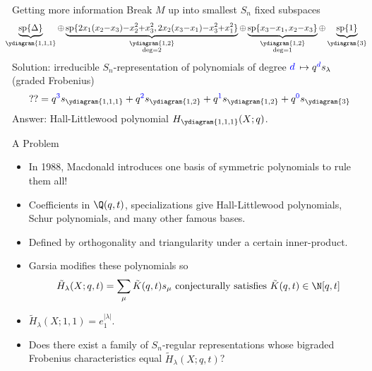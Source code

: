 \documentclass[dvipsnames]{beamer}
\renewcommand{\Span}{\operatorname{sp}}
\theoremstyle{definition}
\newcounter{c}
\begin{document}
\begin{frame}{Getting more information}
  \pause
  Break \(M\) up into smallest \(S_n\) fixed subspaces 
  \[
    \hspace{-0.75em}
    \scalebox{0.95}{\(
      \underbrace{\Span\{\Delta\}}_{\ydiagram{1,1,1}} {\oplus} \underbrace{\Span\{2x_1(x_2{-}x_3){-}x_2^2{+}x_3^2,
        2x_2(x_3{-}x_1){-}x_3^2{+}x_1^2\}}_{\substack{\ydiagram{1,2}\\\deg
        = 2}} {\oplus}
      \underbrace{\Span\{x_3{-}x_1, x_2{-}x_3\}}_{\substack{\ydiagram{1,2}\\\deg=1}} {\oplus} \underbrace{\Span\{1\}}_{\ydiagram{3}}\)}
  \]
  \pause
  Solution: irreducible \(S_n\)-representation of polynomials of degree \(\textcolor{blue}{d}\) \(\mapsto q^{\textcolor{blue}{d}}
  s_\lambda\) (graded Frobenius)\[
    ?? = q^{\textcolor{blue}{3}} s_{\ydiagram{1,1,1}} + q^{\textcolor{blue}{2}} s_{\ydiagram{1,2}} + q^{\textcolor{blue}{1}}
    s_{\ydiagram{1,2}} + q^{\textcolor{blue}{0}}s_{\ydiagram{3}}
  \]\pause
  Answer: Hall-Littlewood polynomial \(H_{\ydiagram{1,1,1}}(X;q)\).
\end{frame}
\begin{frame}{A Problem}
  \begin{itemize}
  \item In 1988, Macdonald introduces one basis of symmetric
    polynomials to rule them all!\pause
  \item Coefficients in \(\Q(q,t)\), specializations give
    Hall-Littlewood polynomials, Schur polynomials, and many other famous bases.\pause
  \item Defined by orthogonality and triangularity under a certain
    inner-product. \pause
  \item Garsia modifies these polynomials so 
    \[
      \tilde{H}_\lambda(X;q,t) = \sum_\mu \tilde{K}(q,t) s_\mu \text{
        conjecturally satisfies }\tilde{K}(q,t) \in \N[q,t]
    \]\pause
  \item \(\tilde{H}_\lambda(X;1,1) = e_1^{|\lambda|}\).\pause
  \item Does there
    exist a family of \(S_n\)-regular representations whose bigraded
    Frobenius characteristics equal \(\tilde{H}_\lambda(X;q,t)\)?
  \end{itemize}
\end{frame}
\end{document}
